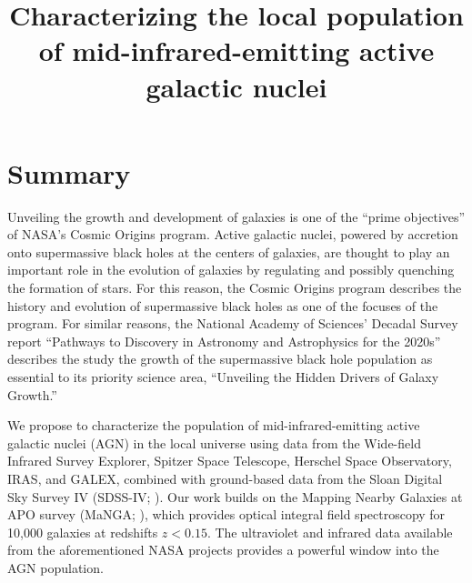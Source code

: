 \documentclass[12pt, preprint]{hacked-aastex}
\begin{document}
\pagestyle{plain}

\newcommand{\imtxt}[1]{\textcolor{red}{#1}}
\newcommand{\imsout}[1]{\textcolor{red}{\sout{#1}}}

\title{{\large Characterizing the local population of mid-infrared-emitting active galactic nuclei}}

\maketitle

{\hypersetup{hidelinks} \tableofcontents }


\newpage
\section{Summary}\label{sec:summary}

Unveiling the growth and development of galaxies is one of the 
``prime objectives'' of NASA's Cosmic Origins program. 
Active galactic nuclei, powered by accretion onto supermassive 
black holes at the centers of galaxies, are thought to play an 
important role in the
evolution of galaxies by regulating and possibly quenching the
formation of stars.  For this reason, the Cosmic Origins 
program describes the history and evolution of supermassive 
black holes as one of the focuses of the program.
For similar reasons, the National Academy of Sciences' 
Decadal Survey report ``Pathways to Discovery in Astronomy and
Astrophysics for the 2020s'' describes the study the growth of the 
supermassive black hole population as essential to its priority 
science area, ``Unveiling the Hidden Drivers of Galaxy Growth.''

We propose to characterize the population of mid-infrared-emitting
active galactic nuclei (AGN) in the local universe using data from 
the Wide-field  Infrared Survey Explorer, Spitzer Space Telescope, 
Herschel Space Observatory, IRAS, and GALEX, combined with 
ground-based data from the Sloan Digital Sky Survey IV (SDSS-IV;
\cite{blanton17a}). 
Our work builds on the Mapping Nearby Galaxies at APO
survey (MaNGA; \cite{bundy15a}), which provides optical integral
field spectroscopy for 10,000 galaxies at redshifts $z<0.15$. 
The ultraviolet and infrared data available from  the aforementioned
NASA projects provides a powerful window into the AGN population.
\end{document}

